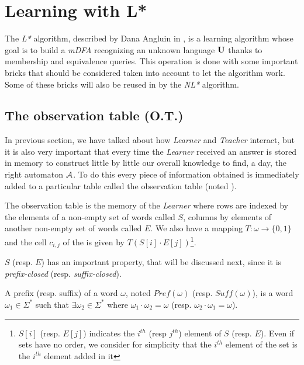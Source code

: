 \section{Learning with L* }
\label{section:L}

The \textit{L*} algorithm, described by Dana Angluin in \cite{LPaper}, is a learning algorithm whose goal is to build a \textit{mDFA} recognizing an unknown language $\mathbf{U}$ thanks to membership and equivalence queries. This operation is done with some important bricks that should be considered taken into account to let the algorithm work. Some of these bricks will also be reused in by the \textit{NL*} algorithm.

\subsection{The observation table (O.T.)}
In previous section, we have talked about how \textit{Learner} and \textit{Teacher} interact, but it is also very important that every time the \textit{Learner} received an answer is stored in memory to construct little by little our overall knowledge to find, a day, the right automaton $\mathcal{A}$. To do this every piece of information obtained is immediately added to a particular table called the observation table (noted \OT).

\begin{definition}
  The observation table is the memory of the \textit{Learner} where rows are indexed by the elements of a non-empty set of words called $S$, columns by elements of another non-empty set of words called $E$. We also have a mapping $T : \omega \rightarrow \{0, 1\}$ and the cell $c_{i,j}$ of the \OT is given by $T(S[i] \cdot E[j])$\footnote{$S[i]$ (resp. $E[j]$) indicates the $i^{th}$ (resp $j^{th}$) element of $S$ (resp. $E$). Even if sets have no order, we consider for simplicity that the $i^{th} $ element of the set is the $i^{th}$ element added in it}.
\end{definition}

$S$ (resp. $E$) has an important property, that will be discussed next, since it is \textit{prefix-closed} (resp. \textit{suffix-closed}).

\begin{definition}
  A prefix (resp. suffix) of a word $\omega$, noted $Pref(\omega)$ (resp. $Suff(\omega)$), is a word $\omega_1 \in \Sigma^*$ such that $\exists \omega_2 \in \Sigma^*$ where $\omega_1 \cdot \omega_2 = \omega$ (resp. $\omega_2 \cdot \omega_1 = \omega$).
\end{definition}

